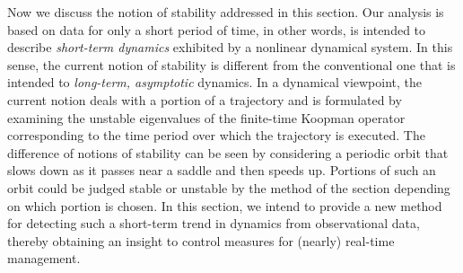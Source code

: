 \documentclass[a4paper,10pt]{article}
\begin{document}
%
Now we discuss the notion of stability addressed in this section.  
Our analysis is based on data for only a short period of time, in other words, is intended to describe \emph{short-term dynamics} exhibited by a nonlinear dynamical system.   
In this sense, the current notion of stability is different from the conventional one that is intended to \emph{long-term, asymptotic} dynamics.  
In a dynamical viewpoint, the current notion deals with a portion of a trajectory and is formulated by examining the unstable eigenvalues of the finite-time Koopman operator corresponding to the time period over which the trajectory is executed.  
The difference of notions of stability can be seen by considering a periodic orbit that slows down as it passes near a saddle and then speeds up.   
Portions of such an orbit could be judged stable or unstable by the method of the section depending on which portion is chosen.  
In this section, we intend to provide a new method for detecting such a short-term trend in dynamics from observational data, thereby obtaining an insight to control measures for (nearly) real-time management.  
\end{document}
